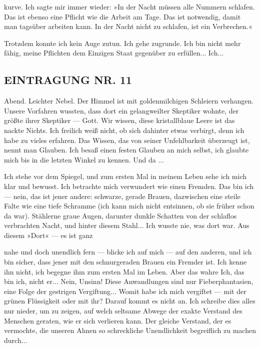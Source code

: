 kurve. Ich sagte mir immer wieder: »In der Nacht müssen alle
Nummern schlafen. Das ist ebenso eine Pflicht wie die Arbeit am
Tage. Das ist notwendig, damit man tags­über arbeiten kann. In der
Nacht nicht zu schlafen, ist ein Verbrechen.«

Trotzdem konnte ich kein Auge zutun. Ich gehe zugrunde. Ich bin
nicht mehr fähig, meine Pflichten dem Einzigen Staat gegenüber zu
erfüllen... Ich...

\subsection{EINTRAGUNG NR. 11}

Abend. Leichter Nebel. Der Himmel ist mit goldenmilchigen Schleiern
verhangen. Unsere Vorfahren wussten, dass dort ein gelangweilter
Skeptiker wohnte, der größte ihrer Skeptiker — Gott. Wir wissen,
diese kristallblaue Leere ist das nackte Nichts. Ich freilich weiß
nicht, ob sich dahinter etwas verbirgt, denn ich habe zu vieles
erfahren. Das Wissen, das von seiner Unfehlbarkeit überzeugt ist,
nennt man Glauben. Ich besaß einen festen Glauben an mich selbst,
ich glaubte mich bis in die letzten Winkel zu kennen. Und da ...

Ich stehe vor dem Spiegel, und zum ersten Mal in meinem Leben sehe
ich mich klar und bewusst. Ich betrachte mich verwundert wie einen
Fremden. Das bin ich — nein, das ist jener andere: schwarze, gerade
Brauen, dazwischen eine steile Falte wie eine tiefe Schramme (ich
kann mich nicht entsinnen, ob sie früher schon da war). Stählerne
graue Augen, darunter dunkle Schatten von der schlaflos verbrachten
Nacht, und hinter diesem Stahl... Ich wusste nie, was dort war. Aus
diesem »Dort« — es ist ganz

nahe und doch unendlich fern — blicke ich auf mich — auf den
anderen, und ich bin sicher, dass jener mit den schnurgeraden
Brauen ein Fremder ist. Ich kenne ihn nicht, ich begegne ihm zum
ersten Mal im Leben. Aber das wahre Ich, das bin ich, nicht er...
Nein, Unsinn! Diese Anwandlungen sind nur Fieberphantasien, eine
Folge der gestrigen Vergiftung... Womit habe ich mich vergiftet —
mit der grünen Flüssigkeit oder mit ihr? Darauf kommt es nicht an.
Ich schreibe dies alles nur nieder, um zu zeigen, auf welch
seltsame Abwege der exakte Verstand des Menschen geraten, wie er
sich verlieren kann. Der gleiche Verstand, der es vermochte, die
unseren Ahnen so schreckliche Unendlichkeit begreiflich zu machen
durch...

